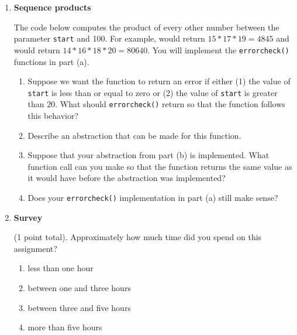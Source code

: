 \documentclass{article}
\newcounter{points}
\newcommand\printpoints{Total number of points: \thepoints}
\begin{document}
\begin{enumerate}
\item \textbf{Sequence products}

The code below computes the product of every other number between the parameter \texttt{start} and 100.  For example,  would return $15 * 17 * 19 = 4845$ and  would return $14 * 16 * 18 * 20 = 80640$.  You will implement the \texttt{errorcheck()} functions in part (a). \\



\begin{enumerate}
\item Suppose we want the function to return an error if either (1) the value of \texttt{start} is less than or equal to zero or (2) the value of \texttt{start} is greater than $20$.  What should \texttt{errorcheck()} return so that the function follows this behavior?
\end{enumerate}

\begin{enumerate}
\setcounter{enumii}{1}
\item Describe an abstraction that can be made for this function.
\end{enumerate}

\begin{enumerate}
\setcounter{enumii}{2}
\item Suppose that your abstraction from part (b) is implemented.  What function call can you make so that the function returns the same value as it would have before the abstraction was implemented?
\end{enumerate}

\begin{enumerate}
\setcounter{enumii}{3}
\item Does your \texttt{errorcheck()} implementation in part (a) still make sense?
\end{enumerate}

\item \textbf{Survey}

(1 point total).  Approximately how much time did you spend on this assignment?
\begin{enumerate}
\item less than one hour
\end{enumerate}

\begin{enumerate}
\setcounter{enumii}{1}
\item between one and three hours
\end{enumerate}

\begin{enumerate}
\setcounter{enumii}{2}
\item between three and five hours
\end{enumerate}

\begin{enumerate}
\setcounter{enumii}{3}
\item more than five hours
\end{enumerate}

\end{enumerate}
\end{document}
